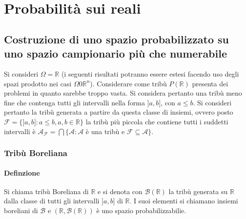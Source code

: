 \chapter{Probabilit\`a sui reali}
\section{Costruzione di uno spazio probabilizzato su uno spazio campionario pi\`u che numerabile}
Si consideri $\Omega=\mathbb{R}$ (i seguenti risultati potranno essere estesi facendo uso degli spazi prodotto nei casi $\Omega0\mathbb{R}^n$). Considerare come trib\`u $P(\mathbb{R})$ 
presenta dei problemi in quanto sarebbe troppo vasta. Si considera pertanto una trib\`u meno fine che contenga tutti gli intervalli nella forma $]a,b]$, con $a\le b$. Si consideri 
pertanto la trib\`u generata a partire da questa classe di insiemi, ovvero posto $\mathcal{F}=\{]a,b]:a\le b, a, b\in\mathbb{R}\}$ la trib\`u pi\`u piccola che contiene tutti i suddetti
intervalli \`e $\mathcal{A_F}=\bigcap\{\mathcal{A}:\mathcal{A}$ \`e una trib\`u e $\mathcal{F}\subseteq\mathcal{A}\}$.
\subsection{Trib\`u Boreliana}
\subsubsection{Definzione}
Si chiama trib\`u Boreliana di $\mathbb{R}$ e si denota con $\mathcal{B}(\mathbb{R})$ la trib\`u generata su $\mathbb{R}$ dalla classe di tutti gli intervalli $]a,b]$ di $\mathbb{R}$. I 
suoi elementi si chiamano insiemi boreliani di $\mathcal{B}$ e $(\mathbb{R},\mathcal{B}(\mathbb{R}))$ \`e uno spazio probabilizzabilie.
